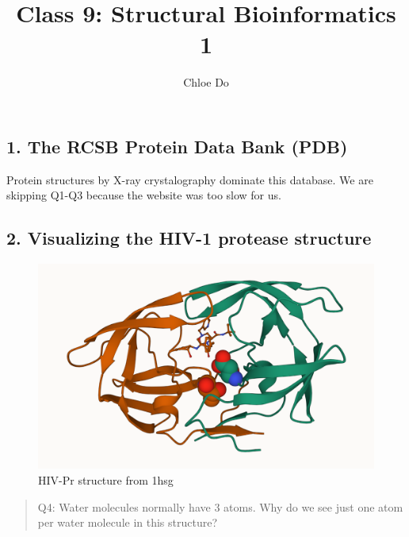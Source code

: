 \documentclass[
  letterpaper,
  DIV=11,
  numbers=noendperiod]{scrartcl}
\title{Class 9: Structural Bioinformatics 1}
\author{Chloe Do}
\date{}
\begin{document}
\maketitle
\ifdefined\Shaded\renewenvironment{Shaded}{\begin{tcolorbox}[boxrule=0pt, sharp corners, interior hidden, frame hidden, borderline west={3pt}{0pt}{shadecolor}, enhanced, breakable]}{\end{tcolorbox}}\fi

\hypertarget{the-rcsb-protein-data-bank-pdb}{%
\subsection{1. The RCSB Protein Data Bank
(PDB)}\label{the-rcsb-protein-data-bank-pdb}}

Protein structures by X-ray crystalography dominate this database. We
are skipping Q1-Q3 because the website was too slow for us.

\hypertarget{visualizing-the-hiv-1-protease-structure}{%
\subsection{2. Visualizing the HIV-1 protease
structure}\label{visualizing-the-hiv-1-protease-structure}}

\begin{figure}

{\centering \includegraphics{1HSG - ASP25.png}

}

\caption{HIV-Pr structure from 1hsg}

\end{figure}

\begin{quote}
Q4: Water molecules normally have 3 atoms. Why do we see just one atom
per water molecule in this structure?
\end{quote}
\end{document}
